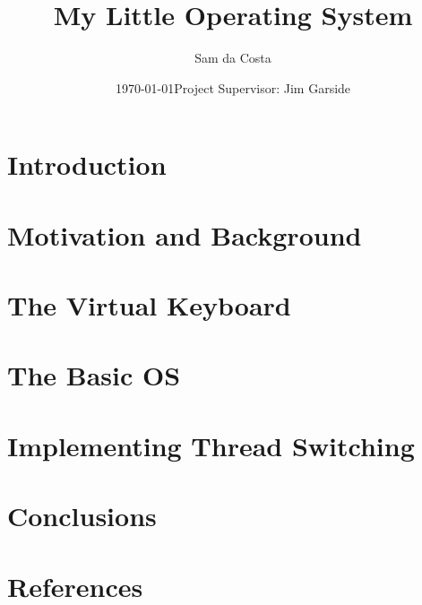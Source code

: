 \documentclass[11pt]{article}
\title{ My Little Operating System }
\author{ Sam da Costa }
\date{\today \endgraf \bigskip Project Supervisor: Jim Garside}
\begin{document}
\maketitle	
\pagebreak


\tableofcontents
\pagebreak


\section{Introduction}

\pagebreak
\section{Motivation and Background}

\pagebreak
\section{The Virtual Keyboard}

\pagebreak
\section{The Basic OS}

\pagebreak
\section{Implementing Thread Switching}

\pagebreak
\section{Conclusions}

\pagebreak
\section{References}

\pagebreak
\end{document}
